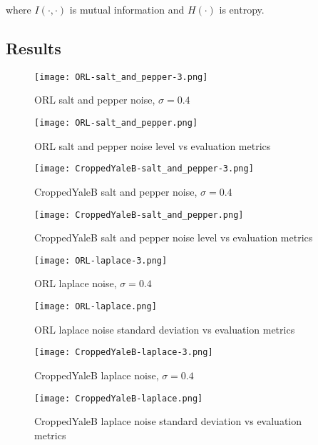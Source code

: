 \documentclass{article} %
\begin{document}
where $I \left ( \cdot , \cdot \right )$ is mutual information and $H \left ( \cdot \right )$ is entropy.

\subsection{Results}
\begin{figure}
\texttt{[image: ORL-salt\_and\_pepper-3.png]}
\caption{ORL salt and pepper noise, $\sigma=0.4$ \label{fig:ORL-salt_and_pepper-3}}
\end{figure}
\begin{figure}
\texttt{[image: ORL-salt\_and\_pepper.png]}
\caption{ORL salt and pepper noise level vs evaluation metrics \label{fig:ORL-salt_and_pepper}}
\end{figure}
\begin{figure}
\texttt{[image: CroppedYaleB-salt\_and\_pepper-3.png]}
\caption{CroppedYaleB salt and pepper noise, $\sigma=0.4$ \label{fig:CroppedYaleB-salt_and_pepper-3}}
\end{figure}
\begin{figure}
\texttt{[image: CroppedYaleB-salt\_and\_pepper.png]}
\caption{CroppedYaleB salt and pepper noise level vs evaluation metrics \label{fig:CroppedYaleB-salt_and_pepper}}
\end{figure}

\begin{figure}
\texttt{[image: ORL-laplace-3.png]}
\caption{ORL laplace noise, $\sigma=0.4$ \label{fig:ORL-laplace-3}}
\end{figure}
\begin{figure}
\texttt{[image: ORL-laplace.png]}
\caption{ORL laplace noise standard deviation vs evaluation metrics \label{fig:ORL-laplace}}
\end{figure}
\begin{figure}
\texttt{[image: CroppedYaleB-laplace-3.png]}
\caption{CroppedYaleB laplace noise, $\sigma=0.4$ \label{fig:CroppedYaleB-laplace-3}}
\end{figure}
\begin{figure}
\texttt{[image: CroppedYaleB-laplace.png]}
\caption{CroppedYaleB laplace noise standard deviation vs evaluation metrics \label{fig:CroppedYaleB-laplace}}
\end{figure}
\end{document}

